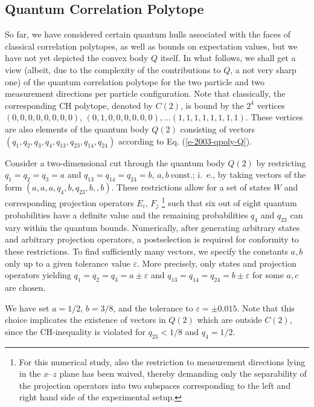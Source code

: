 \subsection{Quantum Correlation Polytope}

So far, we have considered certain quantum hulls associated with
the faces of classical correlation polytopes, as well as bounds on expectation values,
but we have not yet  depicted
the convex body $Q$ itself.
In what follows, we shall get a view
(albeit, due to the complexity of the contributions to $Q$, a not very sharp one)
of the quantum correlation polytope
for the two particle and two measurement directions per particle configuration.
Note that classically,
the corresponding CH polytope, denoted by $C(2)$, is bound by the $2^4$ vertices
$
(0,0,0,0,0,0,0,0)
$,
$
(0,1,0,0,0,0,0,0),
\ldots
(1,1,1,1,1,1,1,1)
$.
These vertices are also elements of the quantum body $Q(2)$ consisting of vectors
$(q_{1},q_{2},q_3,q_4,q_{13},q_{23},q_{14},q_{24})$ according to
Eq. (\ref{e-2003-qpoly-Q}).

Consider a two-dimensional
cut through the quantum body $Q(2)$ by restricting
$q_{1}=q_{2}=q_{3}=a$ and $q_{13}=q_{14}=q_{24}=b$, $a,b\
\mbox{const.}$; i.~e., by taking vectors of the form
$(a,a,a,q_4,b,q_{23},b,,b)$.
These restrictions allow for a set of states
$W$
and corresponding projection operators $E_i,\,F_j$
\footnote{For this numerical study, also
  the restriction to measurement directions lying in the
  $x$--$z$ plane has been waived, thereby demanding only the separability of the
  projection operators into two subspaces corresponding to the left
  and right hand side of the experimental setup.}
such that six out of
eight quantum probabilities have a definite value and the remaining
probabilities $q_4$ and $q_{23}$ can vary within the quantum
bounds.
Numerically, after generating
arbitrary states and arbitrary projection operators,
a postselection is required for conformity to these restrictions.
To find sufficiently many vectors,
we specify the constants $a,b$ only up to a given tolerance value $\varepsilon$.
More precisely, only states and projection operators yielding
 $q_{1}=q_{2}=q_{3}=a\pm\varepsilon$ and
$q_{13}=q_{14}=q_{24}=b\pm\varepsilon$ for some $a,c$ are chosen.

We have set $a=1/2$, $b=3/8$, and the tolerance to $\varepsilon=\pm
0.015$.
Note that this choice implicates the existence of vectors in $Q(2)$ which are
outside $C(2)$, since the CH-inequality
is violated for $q_{23}<1/8$ and $q_4=1/2$.


